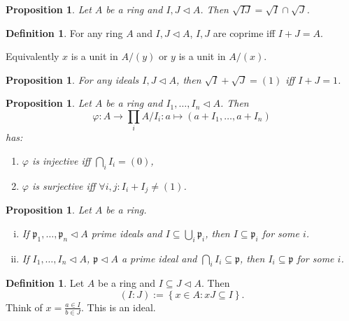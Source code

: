 \documentclass{article}
\newcommand{\setwith}[2]{\left\{#1:#2\right\}}
\newcommand{\primeid}{\mathfrak{p}}
\newcommand{\ideal}{\triangleleft}
\newtheorem{proposition}[theorem]{Proposition}
\theoremstyle{definition}
\newtheorem{definition}[theorem]{Definition}
\begin{document}
\begin{proposition}
    Let \(A\) be a ring and \(I,J\ideal A\). Then
    \(\sqrt{IJ}=\sqrt{I}\cap\sqrt{J}\).
\end{proposition}

\begin{definition}
    For any ring \(A\) and \(I,J\ideal A\), \(I,J\) are coprime iff \(I+J=A\).

    Equivalently \(x\) is a unit in \(A/(y)\) or \(y\) is a unit in \(A/(x)\).
\end{definition}

\begin{proposition}
    For any ideals \(I,J\ideal A\), then \(\sqrt{I}+\sqrt{J}=(1)\) iff
    \(I+J=1\).
\end{proposition}

\begin{proposition}
    Let \(A\) be a ring and \(I_{1},\ldots,I_{n}\ideal A\). Then
    \[
        \varphi:A\to\prod_{i}A/I_{i}:a\mapsto (a+I_{1},\ldots,a+I_{n})
    \]
    has:
    \begin{enumerate}
        \item \(\varphi\) is injective iff \(\bigcap_{i}I_{i}=(0)\),
        \item \(\varphi\) is surjective iff \(\forall i,j:I_{i}+I_{j}\neq(1)\).
    \end{enumerate}
\end{proposition}

\begin{proposition}
    Let \(A\) be a ring.
    \begin{enumerate}[i.]
        \item If \(\primeid_{1},\ldots,\primeid_{n}\ideal A\) prime ideals and
              \(I\subseteq\bigcup_{i}\primeid_{i}\), then
              \(I\subseteq\primeid_{i}\) for some \(i\).

        \item If \(I_{1},\ldots,I_{n}\ideal A\), \(\primeid\ideal A\) a prime
              ideal and \(\bigcap_{i}I_{i}\subseteq\primeid\), then
              \(I_{i}\subseteq\primeid\) for some \(i\).
    \end{enumerate}
\end{proposition}

\begin{definition}
    Let \(A\) be a ring and \(I\subseteq J\ideal A\). Then
    \[
        (I:J):=\setwith{x\in A}{xJ\subseteq I}.
    \]
    Think of \(x=\frac{a\in I}{b\in J}\). This is an ideal.
\end{definition}
\end{document}
